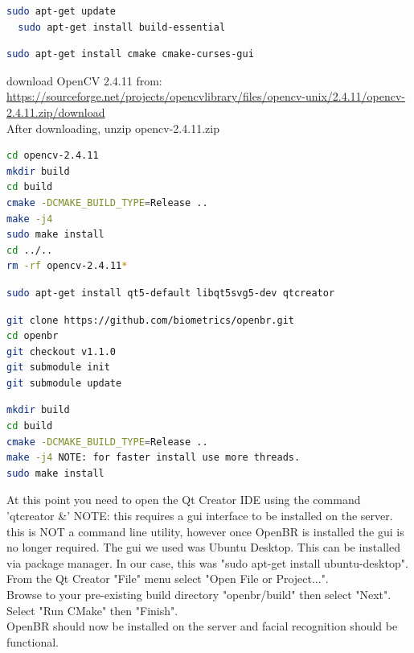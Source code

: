 \documentclass[10pt, onecolumn, twoside, peerreview]{IEEEtran}
\begin{document}
\begin{lstlisting}[language=bash,title={Install GCC4.9.2}]
  sudo apt-get update
  sudo apt-get install build-essential
\end{lstlisting}


\begin{lstlisting}[language=bash,title={Install CMAKE3.0.2}]
  sudo apt-get install cmake cmake-curses-gui
\end{lstlisting}

download OpenCV 2.4.11 from:\\
\url{https://sourceforge.net/projects/opencvlibrary/files/opencv-unix/2.4.11/opencv-2.4.11.zip/download}\\
After downloading, unzip opencv-2.4.11.zip
\begin{lstlisting}[language=bash,title={Download and Install OpenCV2.4.11}]
cd opencv-2.4.11
mkdir build
cd build
cmake -DCMAKE_BUILD_TYPE=Release ..
make -j4
sudo make install
cd ../..
rm -rf opencv-2.4.11*
\end{lstlisting}

\begin{lstlisting}[language=bash,title={Install QT5.4.1}]
sudo apt-get install qt5-default libqt5svg5-dev qtcreator
\end{lstlisting}

\begin{lstlisting}[language=bash,title={Get OpenBR}]
git clone https://github.com/biometrics/openbr.git
cd openbr
git checkout v1.1.0
git submodule init
git submodule update
\end{lstlisting}

\begin{lstlisting}[language=bash,title={Build OpenBR}]
mkdir build
cd build
cmake -DCMAKE_BUILD_TYPE=Release ..
make -j4 NOTE: for faster install use more threads.
sudo make install
\end{lstlisting}

At this point you need to open the Qt Creator IDE using the command 'qtcreator \&' NOTE: this requires a gui interface to be installed on the server. this is NOT a command line utility, however once OpenBR is installed the gui is no longer required. The gui we used was Ubuntu Desktop. This can be installed via package manager. In our case, this was "sudo apt-get install ubuntu-desktop".\\
From the Qt Creator "File" menu select "Open File or Project...".\\
Browse to your pre-existing build directory "openbr/build" then select "Next".\\
Select "Run CMake" then "Finish".\\
OpenBR should now be installed on the server and facial recognition should be functional.
\end{document}
